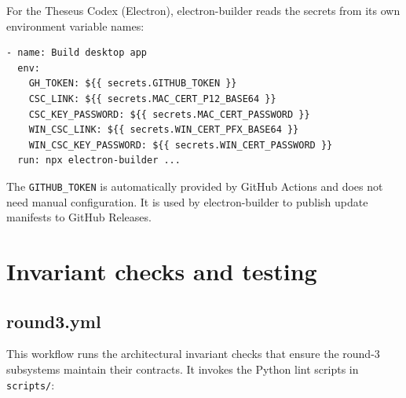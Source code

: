 \documentclass[11pt,letterpaper]{article}
\newcommand{\file}[1]{\texttt{#1}}
\newcommand{\cmd}[1]{\texttt{#1}}
\begin{document}
For the Theseus Codex (Electron), electron-builder reads the secrets from its own environment variable names:

\begin{lstlisting}
- name: Build desktop app
  env:
    GH_TOKEN: ${{ secrets.GITHUB_TOKEN }}
    CSC_LINK: ${{ secrets.MAC_CERT_P12_BASE64 }}
    CSC_KEY_PASSWORD: ${{ secrets.MAC_CERT_PASSWORD }}
    WIN_CSC_LINK: ${{ secrets.WIN_CERT_PFX_BASE64 }}
    WIN_CSC_KEY_PASSWORD: ${{ secrets.WIN_CERT_PASSWORD }}
  run: npx electron-builder ...
\end{lstlisting}

The \cmd{GITHUB\_TOKEN} is automatically provided by GitHub Actions and does not need manual configuration. It is used by electron-builder to publish update manifests to GitHub Releases.

\section{Invariant checks and testing}

\subsection{round3.yml}

This workflow runs the architectural invariant checks that ensure the round-3 subsystems maintain their contracts. It invokes the Python lint scripts in \file{scripts/}:
\end{document}
